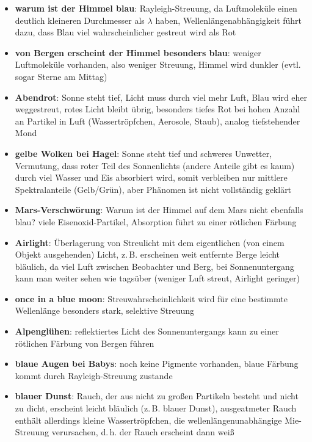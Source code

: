 \begin{itemize}
    \item
    \textbf{warum ist der Himmel blau}:
    Rayleigh-Streuung, da Luftmoleküle einen deutlich kleineren Durchmesser
    als $\lambda$ haben, Wellenlängenabhängigkeit führt dazu, dass Blau
    viel wahrscheinlicher gestreut wird als Rot
    
    \item
    \textbf{von Bergen erscheint der Himmel besonders blau}:
    weniger Luftmoleküle vorhanden, also weniger Streuung, Himmel wird dunkler
    (evtl. sogar Sterne am Mittag)
    
    \item
    \textbf{Abendrot}:
    Sonne steht tief, Licht muss durch viel mehr Luft, Blau wird eher
    weggestreut, rotes Licht bleibt übrig,
    besonders tiefes Rot bei hohen Anzahl an Partikel in Luft
    (Wassertröpfchen, Aerosole, Staub),
    analog tiefstehender Mond
    
    \item
    \textbf{gelbe Wolken bei Hagel}:
    Sonne steht tief und schweres Unwetter, Vermutung, dass roter Teil des
    Sonnenlichts (andere Anteile gibt es kaum) durch viel Wasser und Eis
    absorbiert wird, somit verbleiben nur mittlere Spektralanteile
    (Gelb/Grün), aber Phänomen ist nicht vollständig geklärt
    
    \item
    \textbf{Mars-Verschwörung}:
    Warum ist der Himmel auf dem Mars nicht ebenfalls blau?
    viele Eisenoxid-Partikel, Absorption führt zu einer rötlichen Färbung
    
    \item
    \textbf{Airlight}:
    Überlagerung von Streulicht mit dem eigentlichen
    (von einem Objekt ausgehenden) Licht,
    z.\,B. erscheinen weit entfernte Berge leicht bläulich, da viel Luft
    zwischen Beobachter und Berg,
    bei Sonnenuntergang kann man weiter sehen wie tagsüber
    (weniger Luft streut, Airlight geringer)
    
    \item
    \textbf{once in a blue moon}:
    Streuwahrscheinlichkeit wird für eine bestimmte Wellenlänge besonders
    stark, selektive Streuung
    
    \item
    \textbf{Alpenglühen}:
    reflektiertes Licht des Sonnenuntergangs kann zu einer rötlichen
    Färbung von Bergen führen
\end{itemize}
\linie
\pagebreak
\begin{itemize}
    \item
    \textbf{blaue Augen bei Babys}:
    noch keine Pigmente vorhanden, blaue Färbung kommt durch Rayleigh-Streuung
    zustande
    
    \item
    \textbf{blauer Dunst}:
    Rauch, der aus nicht zu großen Partikeln besteht und nicht zu dicht,
    erscheint leicht bläulich (z.\,B. blauer Dunst),
    ausgeatmeter Rauch enthält allerdings kleine Wassertröpfchen,
    die wellenlängenunabhängige Mie-Streuung verursachen, d.\,h. der Rauch
    erscheint dann weiß
\end{itemize}
